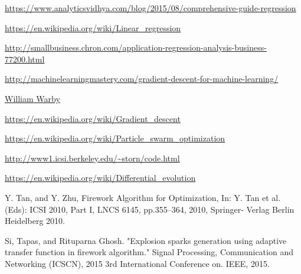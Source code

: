 \documentclass[11pt, a4paper]{report}
\begin{document}
\newpage
\begin{thebibliography}{50}
	
\url{https://www.analyticsvidhya.com/blog/2015/08/comprehensive-guide-regression}

\url{https://en.wikipedia.org/wiki/Linear_regression}

\url{http://smallbusiness.chron.com/application-regression-analysis-business-77200.html}

\url{http://machinelearningmastery.com/gradient-descent-for-machine-learning/}

\href{https://www.flickr.com/photos/wwarby/4046737583/}{William Warby}

\url{https://en.wikipedia.org/wiki/Gradient_descent}

\url{https://en.wikipedia.org/wiki/Particle_swarm_optimization}

\url{http://www1.icsi.berkeley.edu/~storn/code.html}

\url{https://en.wikipedia.org/wiki/Differential_evolution}

Y. Tan, and Y. Zhu, Firework Algorithm for Optimization, In: Y. Tan et
al.(Eds): ICSI 2010, Part I, LNCS 6145, pp.355–364, 2010, Springer-
Verlag Berlin Heidelberg 2010.

Si, Tapas, and Rituparna Ghosh. "Explosion sparks generation using adaptive transfer function in firework algorithm." Signal Processing, Communication and Networking (ICSCN), 2015 3rd International Conference on. IEEE, 2015.

\end{thebibliography}
\end{document}
